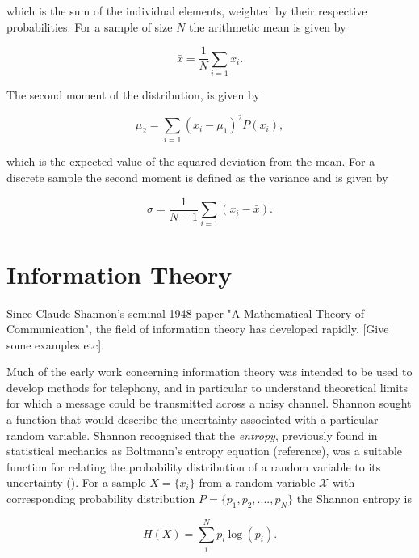 \noindent which is the sum of the individual elements, weighted by their respective probabilities. For a sample of size $N$ the arithmetic mean is given by 

\begin{equation}
\bar{x} = \frac{1}{N}\sum_{i=1}{x_i}.
\end{equation}

\noindent The second moment of the distribution, is given by

\begin{equation}
\mu_2 = \sum_{i=1}{(x_i - \mu_1)^{2}P(x_i)},
\end{equation}

\noindent which is the expected value of the squared deviation from the mean. For a discrete sample the second moment is defined as the variance and is given by 

\begin{equation}
\sigma = \frac{1}{N-1}\sum_{i=1}{(x_i - \bar{x})}.
\end{equation}

\section{Information Theory}

Since Claude Shannon's seminal 1948 paper "A Mathematical Theory of Communication", the field of information theory has developed rapidly. [Give some examples etc].


 Much of the early work concerning information theory was intended to be used to develop methods for telephony, and in particular to understand theoretical limits for which a message could be transmitted across a noisy channel. Shannon sought a function that would describe the uncertainty associated with a particular random variable. Shannon recognised that the \textit{entropy}, previously found in statistical mechanics as Boltmann's entropy equation (reference), was a suitable function for relating the probability distribution of a random variable to its uncertainty (\cite{shannon2001mathematical}). For a sample $X = \{x_i\}$ from a random variable $\mathcal{X}$ with corresponding probability distribution $P = \{p_1, p_2, ...., p_N\}$ the Shannon entropy is 

\begin{equation}
	H(X) = \sum_i^N{p_i \: \text{log} \: (p_i)}.
\end{equation}

